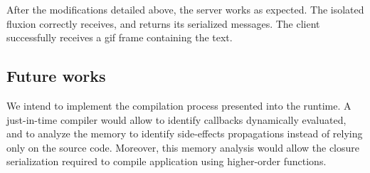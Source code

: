 

After the modifications detailed above, the server works as expected. %
The isolated fluxion correctly receives, and returns its serialized messages.
The client successfully receives a gif frame containing the text.

\subsection{Future works}

We intend to implement the compilation process presented into the runtime.
A just-in-time compiler would allow to identify callbacks dynamically evaluated, and to analyze the memory to identify side-effects propagations instead of relying only on the source code.
Moreover, this memory analysis would allow the closure serialization required to compile application using higher-order functions.



